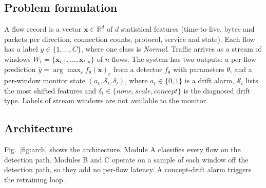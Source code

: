 \documentclass[conference]{IEEEtran}
\begin{document}
\subsection{Problem formulation}
A flow record is a vector $\mathbf{x}\in\mathbb{R}^{d}$ of $d$ statistical features (time-to-live, bytes and packets per direction, connection counts, protocol, service and state). Each flow has a label $y\in\{1,\dots,C\}$, where one class is \textit{Normal}. Traffic arrives as a stream of windows $W_t=\{\mathbf{x}_{t,1},\dots,\mathbf{x}_{t,n}\}$ of $n$ flows. The system has two outputs: a per-flow prediction $\hat{y}=\arg\max_c f_\theta(\mathbf{x})_c$ from a detector $f_\theta$ with parameters $\theta$, and a per-window monitor state $(a_t, \mathcal{S}_t, \delta_t)$, where $a_t\in\{0,1\}$ is a drift alarm, $\mathcal{S}_t$ lists the most shifted features and $\delta_t\in\{\textit{none},\textit{scale},\textit{concept}\}$ is the diagnosed drift type. Labels of stream windows are not available to the monitor.

\subsection{Architecture}
Fig.~\ref{fig:arch} shows the architecture. Module A classifies every flow on the detection path. Modules B and C operate on a sample of each window off the detection path, so they add no per-flow latency. A concept-drift alarm triggers the retraining loop.
\end{document}

